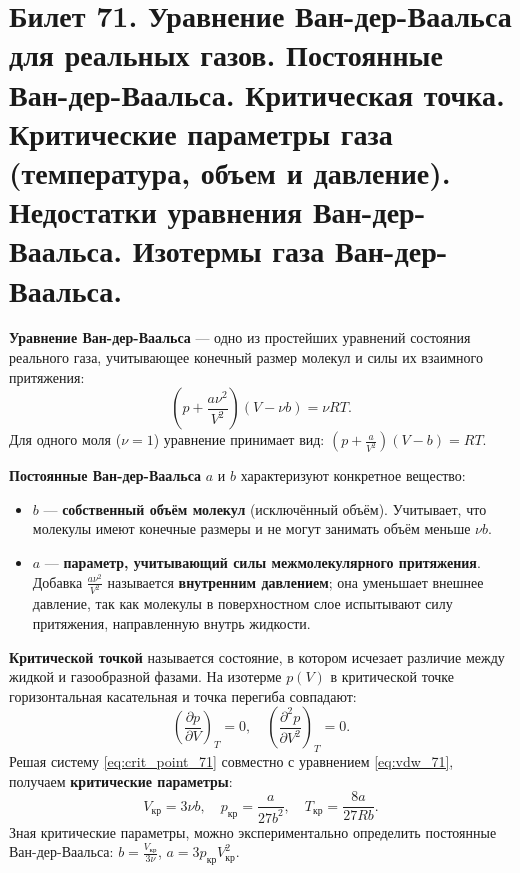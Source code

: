\section{Билет 71. Уравнение Ван-дер-Ваальса для реальных газов. Постоянные Ван-дер-Ваальса. Критическая точка. Критические параметры газа (температура, объем и давление). Недостатки уравнения Ван-дер-Ваальса. Изотермы газа Ван-дер-Ваальса.}

\begin{definition}
\textbf{Уравнение Ван-дер-Ваальса} --- одно из простейших уравнений состояния реального газа, учитывающее конечный размер молекул и силы их взаимного притяжения:
\begin{equation}
    \left(p + \frac{a \nu^2}{V^2}\right)(V - \nu b) = \nu R T. \label{eq:vdw_71}
\end{equation}
Для одного моля ($\nu = 1$) уравнение принимает вид: $\left(p + \frac{a}{V^2}\right)(V - b) = R T$.
\end{definition}

\begin{definition}
\textbf{Постоянные Ван-дер-Ваальса} $a$ и $b$ характеризуют конкретное вещество:
\begin{itemize}
    \item $b$ --- \textbf{собственный объём молекул} (исключённый объём). Учитывает, что молекулы имеют конечные размеры и не могут занимать объём меньше $\nu b$.
    \item $a$ --- \textbf{параметр, учитывающий силы межмолекулярного притяжения}. Добавка $\frac{a \nu^2}{V^2}$ называется \textbf{внутренним давлением}; она уменьшает внешнее давление, так как молекулы в поверхностном слое испытывают силу притяжения, направленную внутрь жидкости.
\end{itemize}
\end{definition}

\begin{theorem}
\textbf{Критической точкой} называется состояние, в котором исчезает различие между жидкой и газообразной фазами. На изотерме $p(V)$ в критической точке горизонтальная касательная и точка перегиба совпадают:
\begin{equation}
    \left(\frac{\partial p}{\partial V}\right)_T = 0, \quad \left(\frac{\partial^2 p}{\partial V^2}\right)_T = 0. \label{eq:crit_point_71}
\end{equation}
Решая систему \eqref{eq:crit_point_71} совместно с уравнением \eqref{eq:vdw_71}, получаем \textbf{критические параметры}:
\begin{equation}
    V_{\text{кр}} = 3\nu b, \quad p_{\text{кр}} = \frac{a}{27b^2}, \quad T_{\text{кр}} = \frac{8a}{27Rb}. \label{eq:crit_params_71}
\end{equation}
Зная критические параметры, можно экспериментально определить постоянные Ван-дер-Ваальса: $b = \frac{V_{\text{кр}}}{3\nu}$, $a = 3 p_{\text{кр}} V_{\text{кр}}^2$.
\end{theorem}

